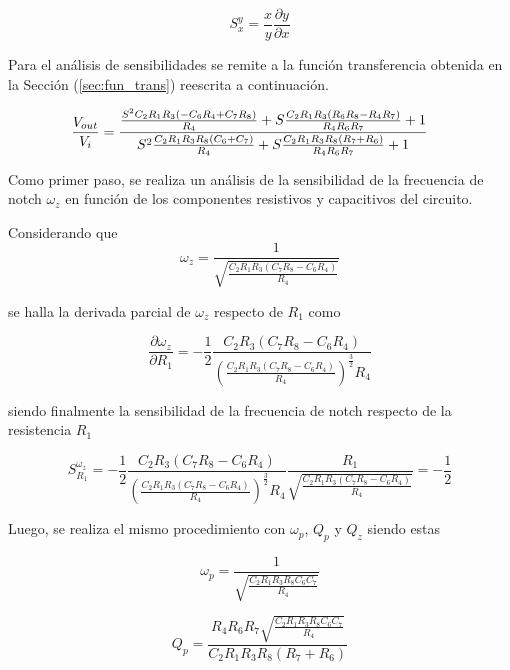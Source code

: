 \begin{equation}
S^y_x = \frac{x}{y} \frac{\partial y}{\partial x}
\end{equation}

Para el análisis de sensibilidades se remite a la función transferencia obtenida en la Sección (\ref{sec:fun_trans}) reescrita a continuación.

\[
\hspace{-0.5cm}
\frac{V_{out}}{V_i} = \frac{\frac{S^2 C_2 R_1 R_3 (-C_6 R_4 + C_7 R_8)}{R_4} + S \frac{C_2 R_1 R_3 (R_6 R_8 - R_4 R_7)}{R_4 R_6 R_7} + 1}{S^2 \frac{C_2 R_1 R_3 R_8 (C_6 + C_7)}{R_4}+S \frac{C_2 R_1 R_3 R_8 (R_7 + R_6)}{R_4 R_6 R_7} + 1}
\]

Como primer paso, se realiza un análisis de la sensibilidad de la frecuencia de notch $\omega_z$ en función de los componentes resistivos y capacitivos del circuito.

Considerando que
\begin{equation}
\omega_z = \frac{1}{\sqrt{\frac{C_2 R_1 R_3 (C_7 R_8 - C_6 R_4)}{R_4}}}
\end{equation}

se halla la derivada parcial de $\omega_z$ respecto de $R_1$ como

\begin{equation}
\frac{\partial \omega_z}{\partial R_1} = -\frac{1}{2} \frac{C_2 R_3 (C_7 R_8 - C_6 R_4)}{(\frac{C_2 R_1 R_3 (C_7 R_8 - C_6 R_4)}{R_4})^{\frac{3}{2}} R_4}
\end{equation}

siendo finalmente la sensibilidad de la frecuencia de notch respecto de la resistencia $R_1$

\begin{equation}
S^{\omega_z}_{R_1} = -\frac{1}{2} \frac{C_2 R_3 (C_7 R_8 - C_6 R_4)}{(\frac{C_2 R_1 R_3 (C_7 R_8 - C_6 R_4)}{R_4})^{\frac{3}{2}} R_4} \frac{R_1}{\sqrt{\frac{C_2 R_1 R_3 (C_7 R_8 - C_6 R_4)}{R_4}}} = -\frac{1}{2}
\end{equation}

Luego, se realiza el mismo procedimiento con $\omega_p$, $Q_p$ y $Q_z$ siendo estas

\begin{equation}
\omega_p = \frac{1}{\sqrt{\frac{C_2 R_1 R_3 R_8  C_6 C_7}{R_4}}}
\end{equation}

\begin{equation}
Q_p = \frac{R_4 R_6 R_7 \sqrt{\frac{C_2 R_1 R_3 R_8 C_6 C_7}{R_4}}}{C_2 R_1 R_3 R_8 (R_7 + R_6)}
\end{equation}


